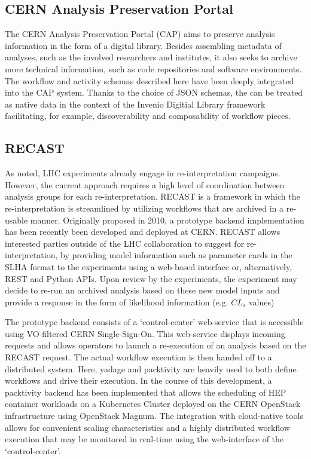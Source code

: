 \documentclass[a4paper]{jpconf}
\begin{document}
\subsection{CERN Analysis Preservation Portal}

The CERN Analysis Preservation Portal (CAP)\cite{Chen2016} aims to preserve analysis information in the form of a digital library. Besides assembling metadata of analyses, such as the involved researchers and institutes, it also seeks to archive more technical information, such as code repositories and software environments. The workflow and activity schemas described here have been deeply integrated into the CAP system. Thanks to the choice of JSON schemas, the can be treated as native data in the context of the Invenio Digitial Library framework\cite{Invenio} facilitating, for example, discoverability and composability of workflow pieces. 

\subsection{RECAST}

As noted, LHC experiments already engage in re-interpretation campaigns. However, the current approach requires a high level of coordination between analysis groups for each re-interpretation. RECAST is a framework in which the re-interpretation is streamlined by utilizing workflows that are archived in a re-usable manner. Originally proposed in 2010, a prototype backend implementation has been recently been developed and deployed at CERN. RECAST allows interested parties outside of the LHC collaboration to suggest for re-interpretation, by providing model information such as parameter cards in the SLHA format to the experiments using a web-based interface or, alternatively, REST and Python APIs. Upon review by the experiments, the experiment may decide to re-run an archived analysis based on these new model inputs and provide a response in the form of likelihood information (e.g. $CL_s$ values)

The prototype backend consists of a `control-center' web-service that is accessible using VO-filtered CERN Single-Sign-On. This web-service displays incoming requests and allows operators to launch a re-execution of an analysis based on the RECAST request. The actual workflow execution is then handed off to a distributed system. Here, yadage and packtivity are heavily used to both define workflows and drive their execution. In the course of this development, a packtivity backend has been implemented that allows the scheduling of HEP container workloads on a Kubernetes Cluster deployed on the CERN OpenStack infrastructure using OpenStack Magnum. The integration with cloud-native tools allows for convenient scaling characteristics and a highly distributed workflow execution that may be monitored in real-time using the web-interface of the `control-center'.
\end{document}
